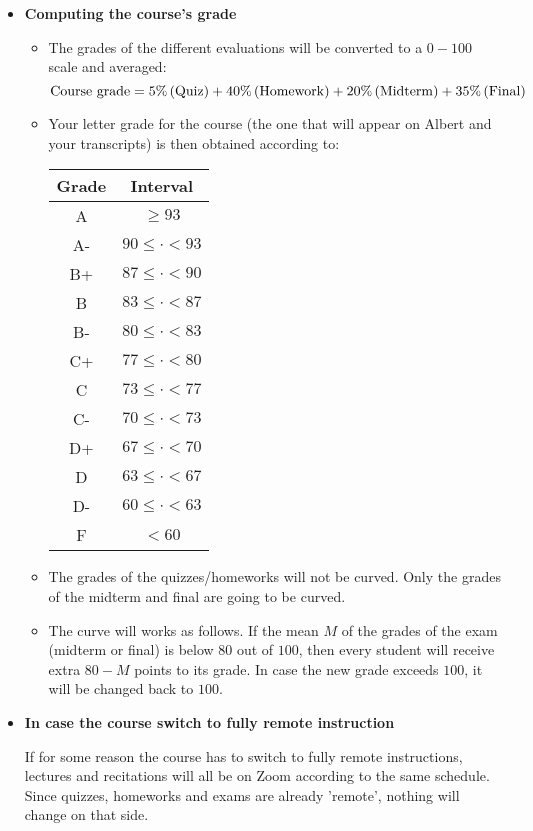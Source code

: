 \documentclass[11pt]{article}
\begin{document}
\begin{itemize}
	
\item \textbf{Computing the course's grade}
	\begin{itemize}
	\item The grades of the different evaluations will be converted to a $0-100$ scale and averaged:
		$$
		{\rm Course \ grade} = 5\%\, ({\rm Quiz}) 
		+ 40\%\, ({\rm Homework})
		+ 20\%\, ({\rm Midterm})
		+ 35\%\, ({\rm Final})
		$$
	\item Your letter grade for the course (the one that will appear on Albert and your transcripts) is then obtained according to:
		\begin{center}
		\begin{tabular}{|c|c|}
			\hline
			Grade & Interval \\
			\hline
			A & $\geq 93$ \\
			A- & $90 \leq \cdot < 93$ \\
			B+ & $87 \leq \cdot < 90$ \\
			B & $83 \leq \cdot < 87$ \\
			B- & $80 \leq \cdot < 83$ \\
			C+ & $77 \leq \cdot < 80$ \\
			C & $73 \leq \cdot < 77$ \\
			C- & $70 \leq \cdot < 73$ \\
			D+ & $67 \leq \cdot < 70$ \\
			D & $63\leq \cdot < 67$ \\
			D- & $60 \leq \cdot < 63$ \\
			F & $< 60$\\
			\hline
		\end{tabular}
		\end{center}
	\item The grades of the quizzes/homeworks will not be curved. Only the grades of the midterm and final are going to be curved.
	\item The curve will works as follows. If the mean $M$ of the grades of the exam (midterm or final) is below $80$ out of $100$, then every student will receive extra $80-M$ points to its grade. In case the new grade exceeds $100$, it will be changed back to $100$.
\end{itemize}

	\item \textbf{In case the course switch to fully remote instruction}

		If for some reason the course has to switch to fully remote instructions, lectures and recitations will all be on Zoom according to the same schedule. Since quizzes, homeworks and exams are already 'remote', nothing will change on that side.


\end{itemize}
\end{document}
